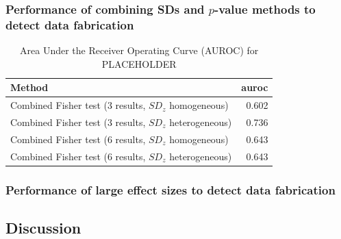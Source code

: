 \documentclass{article}
\begin{document}
\subsubsection*{Performance of combining SDs and $p$-value methods to detect data fabrication}


\begin{table}[ht]
\centering
\begin{tabular}{lr}
  \hline
Method & auroc \\ 
  \hline
Combined Fisher test (3 results, $SD_z$ homogeneous) & 0.602 \\ 
  Combined Fisher test (3 results, $SD_z$ heterogeneous) & 0.736 \\ 
  Combined Fisher test (6 results, $SD_z$ homogeneous) & 0.643 \\ 
  Combined Fisher test (6 results, $SD_z$ heterogeneous) & 0.643 \\ 
   \hline
\end{tabular}
\caption{Area Under the Receiver Operating Curve (AUROC) for PLACEHOLDER} 
\label{auroc_combined}
\end{table}

\subsubsection*{Performance of large effect sizes to detect data fabrication}




\subsection*{Discussion}



\end{document}

